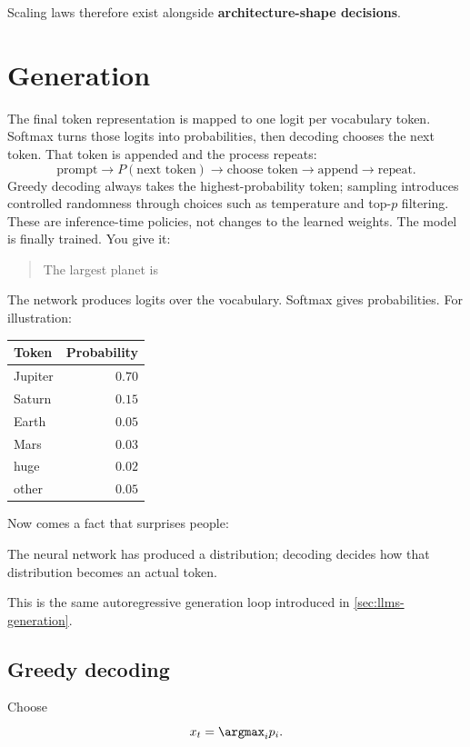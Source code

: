 Scaling laws therefore exist alongside \textbf{architecture-shape decisions}.


\section{Generation}
The final token representation is mapped to one logit per vocabulary token.
Softmax turns those logits into probabilities, then decoding chooses the next token.
That token is appended and the process repeats:
\[
\boxed{
\text{prompt}
\rightarrow
P(\text{next token})
\rightarrow
\text{choose token}
\rightarrow
\text{append}
\rightarrow
\text{repeat}
}.
\]
Greedy decoding always takes the highest-probability token; sampling introduces controlled randomness through choices such as temperature and top-$p$ filtering.
These are inference-time policies, not changes to the learned weights.
\label{sec:modern-decoding}
The model is finally trained.
You give it:
\begin{quote}
The largest planet is
\end{quote}

The network produces logits over the vocabulary.
Softmax gives probabilities.
For illustration:

\begin{center}
\small
\begin{tabular}{lr}
\toprule
Token & Probability \\
\midrule
Jupiter & $0.70$ \\
Saturn & $0.15$ \\
Earth & $0.05$ \\
Mars & $0.03$ \\
huge & $0.02$ \\
other & $0.05$ \\
\bottomrule
\end{tabular}
\end{center}

Now comes a fact that surprises people:

\begin{calloutmemoryhook}
The neural network has produced a distribution; decoding decides how that distribution becomes an actual token.
\end{calloutmemoryhook}

This is the same autoregressive generation loop introduced in \cref{sec:llms-generation}.

\subsection{Greedy decoding}
\label{subsec:modern-greedy}
Choose
\[
x_t=\argmax_i p_i.
\]

